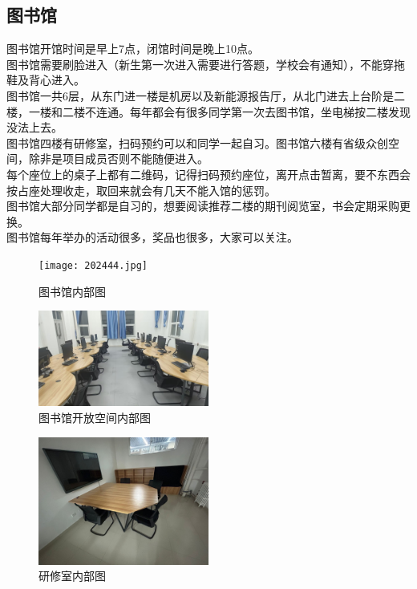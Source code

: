\documentclass[12pt]{article} %
\begin{document}
	\subsection{图书馆}
	图书馆开馆时间是早上7点，闭馆时间是晚上10点。\\
	
	图书馆需要刷脸进入（新生第一次进入需要进行答题，学校会有通知），不能穿拖鞋及背心进入。\\
	
	图书馆一共6层，从东门进一楼是机房以及新能源报告厅，从北门进去上台阶是二楼，一楼和二楼不连通。每年都会有很多同学第一次去图书馆，坐电梯按二楼发现没法上去。\\
	
	图书馆四楼有研修室，扫码预约可以和同学一起自习。图书馆六楼有省级众创空间，除非是项目成员否则不能随便进入。\\
	
	每个座位上的桌子上都有二维码，记得扫码预约座位，离开点击暂离，要不东西会按占座处理收走，取回来就会有几天不能入馆的惩罚。\\
	
	图书馆大部分同学都是自习的，想要阅读推荐二楼的期刊阅览室，书会定期采购更换。\\
	
	图书馆每年举办的活动很多，奖品也很多，大家可以关注。\\
	
	\begin{figure}[!h]
		\centering
		\texttt{[image: 202444.jpg]}
		\caption{图书馆内部图} %
	\end{figure}
		\begin{figure}[!h]
		\centering
		\includegraphics[width=0.5\textwidth]{20247252.jpg}
		\caption{图书馆开放空间内部图} %
	\end{figure}
			\begin{figure}[!h]
		\centering
		\includegraphics[width=0.5\textwidth]{20247253.jpg}
		\caption{研修室内部图} %
	\end{figure}
		\newpage
\end{document}
